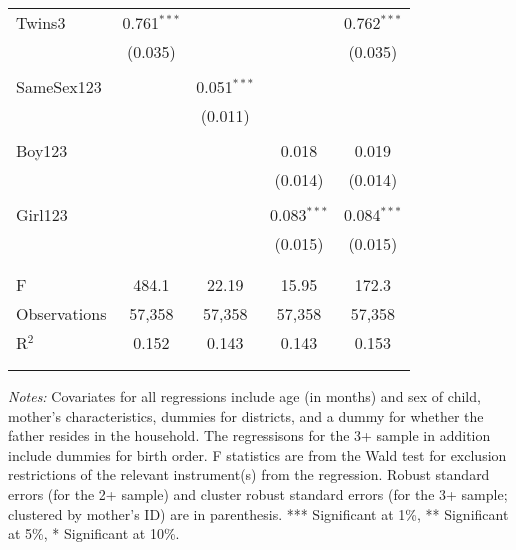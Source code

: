 \begin{table}[!htbp]
\begin{threeparttable}
\begin{tabular}{@{\extracolsep{5pt}}lcccc}
 \\[-1.5ex]
 Twins3 & 0.761$^{***}$ &  &  & 0.762$^{***}$ \\ 
  & (0.035) &  &  & (0.035) \\ 
  & & & & \\ 
 SameSex123 &  & 0.051$^{***}$ &  &  \\ 
  &  & (0.011) &  &  \\ 
  & & & & \\ 
 Boy123 &  &  & 0.018 & 0.019 \\ 
  &  &  & (0.014) & (0.014) \\ 
  & & & & \\ 
 Girl123 &  &  & 0.083$^{***}$ & 0.084$^{***}$ \\ 
  &  &  & (0.015) & (0.015) \\ 
  & & & & \\ 
\cline{2-5} \\[-2.0ex]
F & 484.1 & 22.19 & 15.95 & 172.3 \\ 
Observations & 57,358 & 57,358 & 57,358 & 57,358 \\ 
R$^{2}$ & 0.152 & 0.143 & 0.143 & 0.153 \\ 
\\[-2.0ex]
\hline 
\hline \\[-1.8ex] 
\end{tabular} 
\begin{tablenotes}
\footnotesize
\item \textit{Notes:} Covariates for all regressions include age (in months) and sex of child, 
mother's characteristics, dummies for districts, and a dummy for whether the father resides in the household.
The regressisons for the 3+ sample in addition include dummies for birth order. F statistics are from the Wald 
test for exclusion restrictions of the relevant instrument(s) from the regression. Robust standard errors 
(for the 2+ sample) and cluster robust standard errors (for the 3+ sample; clustered by mother's ID) are in parenthesis. 
*** Significant at 1\%, ** Significant at 5\%, * Significant at 10\%.
\end{tablenotes}
\end{threeparttable}
\end{table} 



